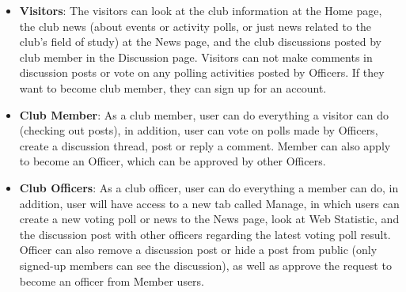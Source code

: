 \documentclass{article}
\begin{document}
\begin{itemize}
    \item \textbf{Visitors}: The visitors can look at the club information at the Home page, the club news (about events or activity polls, or just news related to the club's field of study) at the News page, and the club discussions posted by club member in the Discussion page. Visitors can not make comments in discussion posts or vote on any polling activities posted by Officers. If they want to become club member, they can sign up for an account.
    \item \textbf{Club Member}: As a club member, user can do everything a visitor can do (checking out posts), in addition, user can vote on polls made by Officers, create a discussion thread, post or reply a comment. Member can also apply to become an Officer, which can be approved by other Officers.
    \item \textbf{Club Officers}: As a club officer, user can do everything a member can do, in addition, user will have access to a new tab called Manage, in which users can create a new voting poll or news to the News page, look at Web Statistic, and the discussion post with other officers regarding the latest voting poll result. Officer can also remove a discussion post or hide a post from public (only signed-up members can see the discussion), as well as approve the request to become an officer from Member users.
\end{itemize}
\end{document}
